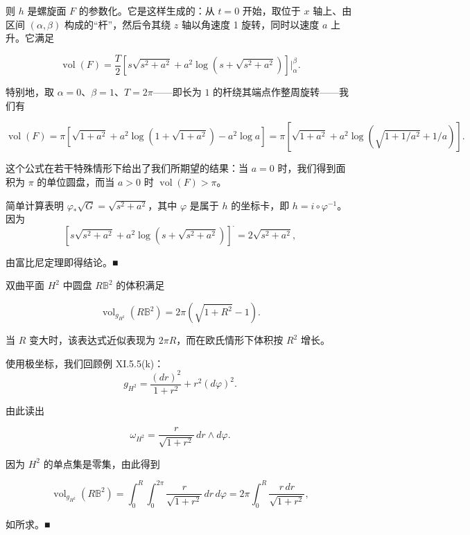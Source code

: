 \begin{example}
则 $ h $ 是螺旋面 $ F $ 的参数化。它是这样生成的：从 $ t = 0 $ 开始，取位于 $ x $ 轴上、由区间 $ (\alpha, \beta) $ 构成的“杆”，然后令其绕 $ z $ 轴以角速度 1 旋转，同时以速度 $ a $ 上升。它满足

\[
\operatorname{vol}(F) = \frac{T}{2}\left[ s\sqrt{s^2 + a^2} + a^2 \log\left(s + \sqrt{s^2 + a^2}\right)\right]\bigg|_{\alpha}^{\beta} .
\]

特别地，取 $ \alpha = 0 $、$ \beta = 1 $、$ T = 2\pi $——即长为 $ 1 $ 的杆绕其端点作整周旋转——我们有

\[
\operatorname{vol}(F)=\pi\left[\sqrt{1+a^{2}}+a^{2}\log\left(1+\sqrt{1+a^{2}}\right)-a^{2}\log a\right]=\pi\left[\sqrt{1+a^{2}}+a^{2}\log\left(\sqrt{1+1/a^{2}}+1/a\right)\right].
\]

这个公式在若干特殊情形下给出了我们所期望的结果：当 $ a=0 $ 时，我们得到面积为 $ \pi $ 的单位圆盘，而当 $ a>0 $ 时 $ \operatorname{vol}(F)>\pi $。

\proofhead
简单计算表明 $ \varphi_{*}\sqrt{G}=\sqrt{s^{2}+a^{2}} $，其中 $ \varphi $ 是属于 $ h $ 的坐标卡，即 $ h=i\circ\varphi^{-1} $。因为
\[
\left[s\sqrt{s^{2}+a^{2}}+a^{2}\log\left(s+\sqrt{s^{2}+a^{2}}\right)\right]^{\cdot}=2\sqrt{s^{2}+a^{2}},
\]

由富比尼定理即得结论。\nobreak\hspace{0.35em}■

\begin{items}
\item[（e）]

双曲平面 $ H^{2} $ 中圆盘 $ R\mathbb{B}^{2} $ 的体积满足

\[
\operatorname{vol}_{g_{H^{2}}}\left(R\mathbb{B}^{2}\right)=2\pi\left(\sqrt{1+R^{2}}-1\right).
\]

当 $ R $ 变大时，该表达式近似表现为 $ 2\pi R $，而在欧氏情形下体积按 $ R^{2} $ 增长。

\proofhead
使用极坐标，我们回顾例 XI.5.5(k)：
\[
g_{H^{2}}=\frac{(dr)^{2}}{1+r^{2}}+r^{2}(d\varphi)^{2}.
\]

由此读出

\[
\omega_{H^{2}}=\frac{r}{\sqrt{1+r^{2}}}\,dr\wedge d\varphi.
\]

因为 $ H^{2} $ 的单点集是零集，由此得到

\[
\operatorname{vol}_{g_{H^{2}}}\left(R\mathbb{B}^{2}\right)=\int_{0}^{R}\int_{0}^{2\pi}\frac{r}{\sqrt{1+r^{2}}}\,dr\,d\varphi=2\pi\int_{0}^{R}\frac{r\,dr}{\sqrt{1+r^{2}}},
\]

如所求。\nobreak\hspace{0.35em}■

\end{items}

\end{example}

